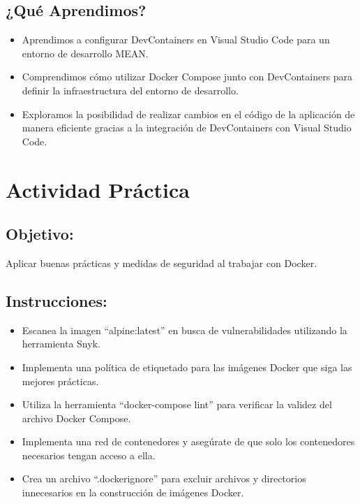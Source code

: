 \documentclass[
  a4paper,
  DIV=11,
  numbers=noendperiod,
  onepage,
  openany]{scrreprt}
\providecommand{\tightlist}{%
  \setlength{\itemsep}{0pt}\setlength{\parskip}{0pt}}\usepackage{longtable,booktabs,array}
\begin{document}
\hypertarget{quuxe9-aprendimos-4}{%
\section{¿Qué Aprendimos?}\label{quuxe9-aprendimos-4}}

\begin{itemize}
\tightlist
\item
  Aprendimos a configurar DevContainers en Visual Studio Code para un
  entorno de desarrollo MEAN.
\item
  Comprendimos cómo utilizar Docker Compose junto con DevContainers para
  definir la infraestructura del entorno de desarrollo.
\item
  Exploramos la posibilidad de realizar cambios en el código de la
  aplicación de manera eficiente gracias a la integración de
  DevContainers con Visual Studio Code.
\end{itemize}

\hypertarget{actividad-pruxe1ctica-5}{%
\chapter{Actividad Práctica}\label{actividad-pruxe1ctica-5}}

\hypertarget{objetivo-4}{%
\section{Objetivo:}\label{objetivo-4}}

Aplicar buenas prácticas y medidas de seguridad al trabajar con Docker.

\hypertarget{instrucciones-3}{%
\section{Instrucciones:}\label{instrucciones-3}}

\begin{itemize}
\tightlist
\item
  Escanea la imagen ``alpine:latest'' en busca de vulnerabilidades
  utilizando la herramienta Snyk.
\item
  Implementa una política de etiquetado para las imágenes Docker que
  siga las mejores prácticas.
\item
  Utiliza la herramienta ``docker-compose lint'' para verificar la
  validez del archivo Docker Compose.
\item
  Implementa una red de contenedores y asegúrate de que solo los
  contenedores necesarios tengan acceso a ella.
\item
  Crea un archivo ``.dockerignore'' para excluir archivos y directorios
  innecesarios en la construcción de imágenes Docker.
\end{itemize}
\end{document}
